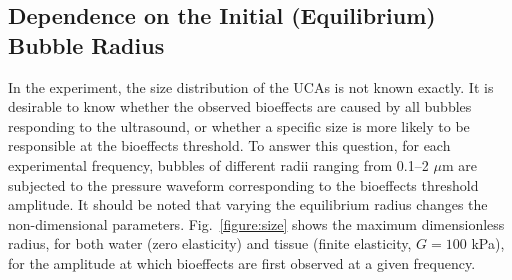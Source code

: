 





\subsection{Dependence on the Initial (Equilibrium) Bubble Radius}

In the experiment, the size distribution of the UCAs is not known
exactly. It is desirable to know whether the observed bioeffects are
caused by all bubbles responding to the ultrasound, or whether a
specific size is more likely to be responsible at the bioeffects
threshold. To answer this question, for each experimental frequency,
bubbles of different radii ranging from 0.1--2 $\mu$m are subjected to
the pressure waveform corresponding to the bioeffects threshold
amplitude. It should be noted that varying the equilibrium radius
changes the non-dimensional parameters. Fig.~\ref{figure:size} shows the maximum dimensionless
radius, for both water (zero elasticity) and tissue (finite
elasticity, $G=100$ kPa), for the amplitude at which bioeffects are
first observed at a given frequency.

